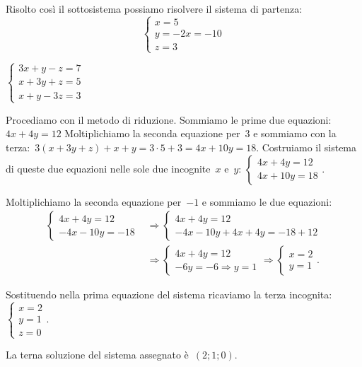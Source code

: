 \begin{soluzione}
Risolto così il sottosistema possiamo risolvere il sistema di partenza:
\[\left\{\begin{array}{l}
  x=5\\
  y=-2x=-10\\
  z=3
\end{array}\right.\]

\end{soluzione}

 \begin{esempio}
$\left\{\begin{array}{l}3x+y-z=7\\x+3y+z=5\\x+y-3z=3\end{array}\right.$

Procediamo con il metodo di riduzione. Sommiamo le prime due 
equazioni:~$4x+4y=12$
Moltiplichiamo la seconda equazione per~3 e sommiamo con la 
terza:~$3(x+3y+z)+x+y=3\cdot 5+3=4x+10y=18$.
Costruiamo il sistema di queste due equazioni
nelle sole due incognite~$x$ e~$y$:
$\left\{\begin{array}{l}4x+4y=12\\4x+10y=18\end{array}\right..$

Moltiplichiamo la seconda equazione per~$-1$ e sommiamo le due equazioni:
\begin{align*}
\left\{\begin{array}{l}4x+4y=12 \\-4x-10y=-18
\end{array}\right.&\Rightarrow
\left\{\begin{array}{l}4x+4y=12
\\-4x-10y+4x+4y=-18+12 \end{array}\right.\\
&\Rightarrow
\left\{\begin{array}{l}4x+4y=12 \\-6y=-6\Rightarrow
y=1 \end{array}\right.\Rightarrow
\left\{\begin{array}{l}x=2 \\y=1
\end{array}\right..
\end{align*}

Sostituendo nella prima equazione del sistema ricaviamo la terza
incognita:~$\left\{\begin{array}{l}x=2\\y=1\\z=0\end{array}\right.$.

La terna soluzione del sistema assegnato è~$(2;1;0)$.
 \end{esempio}

